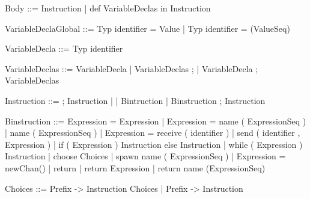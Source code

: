 \documentclass[11pt]{report}
\begin{document}
\begin{verbnobox}[\normalfont]
Body ::= { Instruction } | { def VariableDeclas in Instruction }
\end{verbnobox}
\vspace*{3pt}

\begin{verbnobox}[\normalfont]
VariableDeclaGlobal ::= Typ identifier = Value | Typ identifier = (ValueSeq)
\end{verbnobox}
\vspace*{3pt}

\begin{verbnobox}[\normalfont]
VariableDecla ::= Typ identifier
\end{verbnobox}
\vspace*{3pt}

\begin{verbnobox}[\normalfont]
VariableDeclas ::= VariableDecla 
                    | VariableDeclas ; 
                    | VariableDecla ; VariableDeclas
\end{verbnobox}
\vspace*{3pt}

\begin{verbnobox}[\normalfont]
Instruction ::= ; Instruction
               |
               | Bintruction 
               | Binstruction ; Instruction
\end{verbnobox}
\vspace*{3pt}

\begin{verbnobox}[\normalfont]
Binstruction ::= Expression = Expression 
                 | Expression = name ( ExpressionSeq )
                 | name ( ExpressionSeq )
                 | Expression = receive ( identifier )
                 | send ( identifier , Expression )
                 | if ( Expression ) { Instruction } else { Instruction }
                 | while ( Expression ) { Instruction }
                 | choose { Choices }
                 | spawn name ( ExpressionSeq )
                 | Expression = newChan()
                 | return
                 | return Expression
                 | return name (ExpressionSeq)
\end{verbnobox}
\vspace*{3pt}

\begin{verbnobox}[\normalfont]
Choices ::= Prefix -> { Instruction } Choices | Prefix -> { Instruction }
\end{verbnobox}
\vspace*{3pt}
\end{document}
